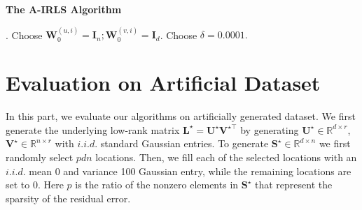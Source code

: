 \documentclass[conference]{IEEEtran}
\begin{document}
\begin{algorithm2e}[h]
\caption{\textbf{The A-IRLS Algorithm}}    
\label{alg:A-IRLS}
. Choose $\boldsymbol{W}^{(u,i)}_{0}=\boldsymbol{I}_n; \boldsymbol{W}^{(v,i)}_{0}=\boldsymbol{I}_d$. Choose $\delta=0.0001.$ \\ 
\end{algorithm2e}







\section{Evaluation on Artificial Dataset}
In this part, we evaluate our algorithms on artificially generated dataset. We first generate the underlying low-rank matrix $\boldsymbol{L}^{\star}=\boldsymbol{U}^{\star}\boldsymbol{V}^{\star\top}$ by generating $\boldsymbol{U}^{\star}\in\mathbb{R}^{d\times r}$, $\boldsymbol{V}^{\star}\in\mathbb{R}^{n\times r}$ with $i.i.d.$ standard Gaussian entries. To generate $\boldsymbol{S}^{\star}\in\mathbb{R}^{d\times n}$ we first randomly select $pdn$ locations. Then, we fill each of the selected locations with an $i.i.d.$ mean 0 and variance 100 Gaussian entry, while the remaining locations are set to 0. Here $p$ is the ratio of the nonzero elements in $\boldsymbol{S}^{\star}$ that represent the sparsity of the residual error.
\end{document}

